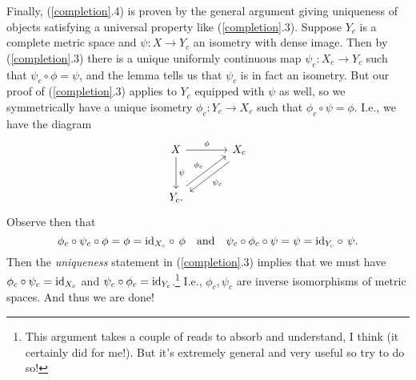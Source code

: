\medskip
Finally, (\ref{completion}.4) is proven by the general argument giving
uniqueness of objects satisfying a universal property like
(\ref{completion}.3). Suppose $Y_c$ is a complete metric space and
$\psi : X \to Y_c$ an isometry with dense image. Then by
(\ref{completion}.3) there is a unique uniformly continuous map
$\psi_c : X_c \to Y_c$ such that $\psi_c \circ \phi = \psi$, and the
lemma tells us that $\psi_c$ is in fact an isometry. But our proof of
(\ref{completion}.3) applies to $Y_c$ equipped with $\psi$ as well, so
we symmetrically have a unique isometry $\phi_c : Y_c \to X_c$ such
that $\phi_c \circ \psi = \phi$. I.e., we have the diagram
\[
\begin{tikzcd}[column sep = large, row sep = large]
  X \rar{\phi} \dar{\psi} & X_c \ar[shift left = .7ex]{dl}{\psi_c}
  \\ Y_c \ar[shift left = .7ex]{ur}{\phi_c}.
\end{tikzcd}
\]
Observe then that
\[
\phi_c \circ \psi_c \circ \phi = \phi = \mathrm{id}_{X_c} \circ\, \phi
\quad\text{and}\quad \psi_c \circ \phi_c \circ \psi = \psi = \mathrm{id}_{Y_c}
\circ\, \psi.
\]
Then the \textit{uniqueness} statement in (\ref{completion}.3) implies
that we must have $\phi_c \circ \psi_c = \mathrm{id}_{X_c}$ and $\psi_c \circ
\phi_c = \mathrm{id}_{Y_c}$.\footnote{This argument takes a couple of reads to
  absorb and understand, I think (it certainly did for me!). But it's
  extremely general and very useful so try to do so!} I.e.,
$\phi_c,\psi_c$ are inverse isomorphisms of metric spaces. And thus we
are done!



